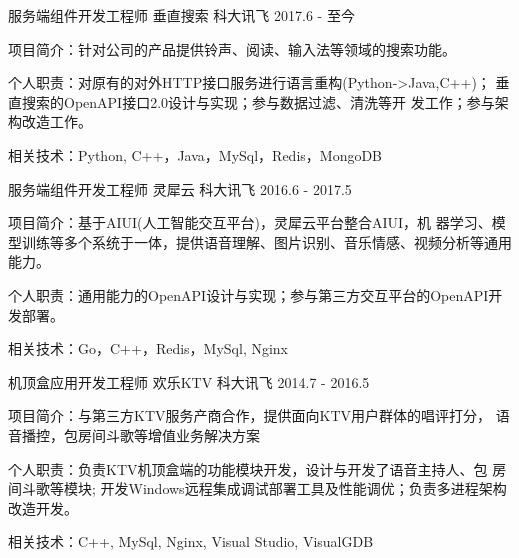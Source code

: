 

\begin{cventries}

  \cventry
    {服务端组件开发工程师} %
    {垂直搜索} %
    {科大讯飞} %
    {2017.6 - 至今} %
    {
      \begin{cvitems} %
      \item {项目简介：针对公司的产品提供铃声、阅读、输入法等领域的搜索功能。}
      \item {个人职责：对原有的对外HTTP接口服务进行语言重构(Python->Java,C++)；
          垂直搜索的OpenAPI接口2.0设计与实现；参与数据过滤、清洗等开
          发工作；参与架构改造工作。}
      \item {相关技术：Python, C++，Java，MySql，Redis，MongoDB}
      \end{cvitems}
    }

  \cventry
    {服务端组件开发工程师} %
    {灵犀云} %
    {科大讯飞} %
    {2016.6 - 2017.5} %
    {
      \begin{cvitems}
      \item {项目简介：基于AIUI(人工智能交互平台)，灵犀云平台整合AIUI，机
          器学习、模型训练等多个系统于一体，提供语音理解、图片识别、音乐情感、视频分析等通用能力。}
      \item {个人职责：通用能力的OpenAPI设计与实现；参与第三方交互平台的OpenAPI开
          发部署。}
      \item {相关技术：Go，C++，Redis，MySql, Nginx}
      \end{cvitems}
    }

  \cventry
    {机顶盒应用开发工程师} %
    {欢乐KTV} %
    {科大讯飞} %
    {2014.7 - 2016.5} %
    {
      \begin{cvitems} %
      \item {项目简介：与第三方KTV服务产商合作，提供面向KTV用户群体的唱评打分，
          语音播控，包房间斗歌等增值业务解决方案}
      \item {个人职责：负责KTV机顶盒端的功能模块开发，设计与开发了语音主持人、包
          房间斗歌等模块; 开发Windows远程集成调试部署工具及性能调优；负责多进程架构改造开发。}
      \item {相关技术：C++, MySql, Nginx, Visual Studio, VisualGDB}
      \end{cvitems}
    }

\end{cventries}
